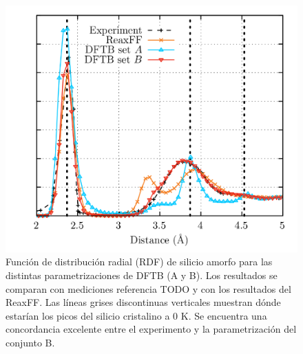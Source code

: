 \begin{figure}[h!]
    \centering
    \includegraphics[width=.7\textwidth]{Silicio/modelo/resultados/rdf/rdf.png}
    \caption{Función de distribución radial (RDF) de silicio amorfo para las 
    distintas parametrizaciones de DFTB (A y B). Los resultados se comparan con 
    mediciones referencia TODO y con los resultados del ReaxFF. Las líneas grises 
    discontinuas verticales muestran dónde estarían los picos del silicio 
    cristalino a 0 K. Se encuentra una concordancia excelente entre el experimento
    y la parametrización del conjunto B.}
    \label{fig:rdfb}
\end{figure}
